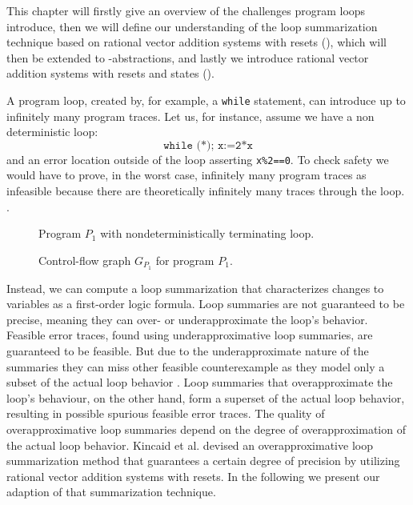 This chapter will firstly give an overview of the challenges program loops introduce, then we will define our understanding of the loop summarization technique based on rational vector addition systems with resets (\qvasr), which will then be extended to \qvasr-abstractions, and lastly we introduce rational vector addition systems with resets and states (\qvasrs). \\ \par
A program loop, created by, for example, a \texttt{while} statement, can introduce up to infinitely many program traces. Let us, for instance, assume we have a non deterministic loop:
\begin{equation*}
	\texttt{while (*); x:=2*x}
\end{equation*}
and an error location outside of the loop asserting \texttt{x\%2==0}. To check safety we would have to prove, in the worst case, infinitely many program traces as infeasible because there are theoretically infinitely many traces through the loop.
.\begin{center}
	\begin{minipage}[b]{0.4\linewidth}
		\begin{figure}[H]
			\centering
			
			\caption{Program $P_1$ with nondeterministically terminating loop.}
			\label{codeExMotAss}
		\end{figure}
	\end{minipage}
	\hfill
	\begin{minipage}[b]{0.59\linewidth}
		\begin{figure}[H]
			\centering
			
			\caption{Control-flow graph $G_{P_1}$ for program $P_1$.}
			\label{cfgExMotAss}
		\end{figure}
	\end{minipage}
\end{center}
Instead, we can compute a loop summarization that characterizes changes to variables as a first-order logic formula. Loop summaries are not guaranteed to be precise, meaning they can over- or underapproximate the loop's behavior. Feasible error traces, found using underapproximative loop summaries, are guaranteed to be feasible. But due to the underapproximate nature of the summaries they can miss other feasible counterexample as they model only a subset of the actual loop behavior \cite{DBLP:journals/fmsd/KroeningLW15}. Loop summaries that overapproximate the loop's behaviour, on the other hand, form a superset of the actual loop behavior, resulting in possible spurious feasible error traces. The quality of overapproximative loop summaries depend on the degree of overapproximation of the actual loop behavior.
Kincaid et al. \cite{DBLP:conf/cav/SilvermanK19} devised an overapproximative loop summarization method that guarantees a certain degree of precision by utilizing rational vector addition systems with resets. In the following we present our adaption of that summarization technique.
